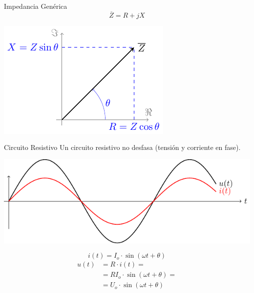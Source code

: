 \documentclass[xcolor={usenames,svgnames,dvipsnames}]{beamer}
\begin{document}
\begin{frame}[label={sec:org578ef4d}]{Impedancia Genérica}
\[
\overline{Z} = R + j X
\]

\begin{center}
\includegraphics[width=.9\linewidth]{figs/fasorImpedancia.pdf}
\end{center}
\end{frame}

\begin{frame}[label={sec:org16d6c68}]{Circuito Resistivo}
Un circuito resistivo no desfasa (\alert{tensión y corriente en fase}).

\begin{center}
\includegraphics[width=.9\linewidth]{figs/resistivo.pdf}
\end{center}

\[
    i(t) = I_o \cdot \sin(\omega t + \theta)
\]
\begin{align*}
  u(t) &= R \cdot i(t)=\\
       &= R I_o \cdot \sin(\omega t + \theta) =\\
       &= U_o \cdot \sin(\omega t + \theta)\\
\end{align*}
\end{frame}
\end{document}
